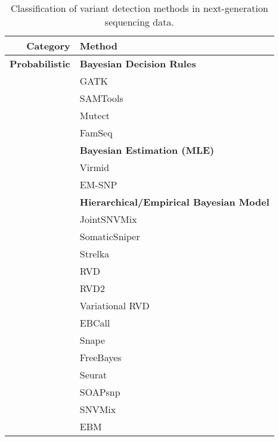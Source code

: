 \documentclass[11pt,reqno]{amsart}
\begin{document}

\begin{table}[htbp]
  \centering
  \caption{Classification of variant detection methods in next-generation sequencing data.}
  \footnotesize
    \begin{tabular}{rr}
    \toprule
    \textbf{Category} & \multicolumn{1}{l}{\textbf{Method}} \\
    \midrule
    \textbf{Probabilistic} & \multicolumn{1}{l}{\textbf{Bayesian Decision Rules}} \\
          & \multicolumn{1}{l}{GATK} \\
          & \multicolumn{1}{l}{SAMTools} \\
          & \multicolumn{1}{l}{Mutect} \\
          & \multicolumn{1}{l}{FamSeq} \\
          & \multicolumn{1}{l}{\textbf{Bayesian Estimation (MLE)}} \\
          & \multicolumn{1}{l}{ Virmid} \\
          & \multicolumn{1}{l}{ EM-SNP} \\
          & \multicolumn{1}{l}{\textbf{Hierarchical/Empirical Bayesian Model}} \\
          & \multicolumn{1}{l}{JointSNVMix} \\
          & \multicolumn{1}{l}{SomaticSniper} \\
          & \multicolumn{1}{l}{Strelka} \\
          & \multicolumn{1}{l}{RVD} \\
          & \multicolumn{1}{l}{RVD2} \\
          & \multicolumn{1}{l}{Variational RVD} \\
          & \multicolumn{1}{l}{EBCall} \\
          & \multicolumn{1}{l}{Snape} \\
          & \multicolumn{1}{l}{FreeBayes} \\
          & \multicolumn{1}{l}{Seurat} \\
          & \multicolumn{1}{l}{SOAPsnp} \\
          & \multicolumn{1}{l}{SNVMix} \\
          & \multicolumn{1}{l}{EBM} \\

\end{tabular}
\end{table}
\end{document}
